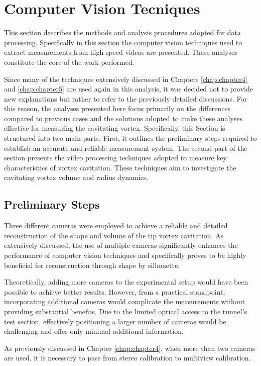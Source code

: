 \section{Computer Vision Tecniques}
\label{CVT2}

This section describes the methods and analysis procedures adopted for data processing. Specifically in this section the computer vision techniques used to extract measurements from high-speed videos are presented.
These analyses constitute the core of the work performed. 

Since many of the techniques extensively discussed in Chapters \ref{chap:chapter4} and \ref{chap:chapter5} are used again in this analysis, it was decided not to provide new explanations but rather to refer to the previously detailed discussions. For this reason, the analyses presented here focus primarily on the differences compared to previous cases and the solutions adopted to make these analyses effective for measuring the cavitating vortex.
Specifically, this Section is structured into two main parts. First, it outlines the preliminary steps required to establish an accurate and reliable measurement system.
The second part of the section presents the video processing techniques adopted to measure key characteristics of vortex cavitation. These techniques aim to investigate the cavitating vortex volume and radius dynamics.

\subsection{Preliminary Steps}
\label{Preliminary2}

Three different cameras were employed to achieve a reliable and detailed reconstruction of the shape and volume of the tip vortex cavitation. As extensively discussed, the use of multiple cameras significantly enhances the performance of computer vision techniques and specifically proves to be highly beneficial for reconstruction through shape by silhouette.

Theoretically, adding more cameras to the experimental setup would have been possible to achieve better results. However, from a practical standpoint, incorporating additional cameras would complicate the measurements without providing substantial benefits. Due to the limited optical access to the tunnel's test section, effectively positioning a larger number of cameras would be challenging and offer only minimal additional information.

As previously discussed in Chapter \ref{chap:chapter4}, when more than two cameras are used, it is necessary to pass from stereo calibration to multiview calibration.

